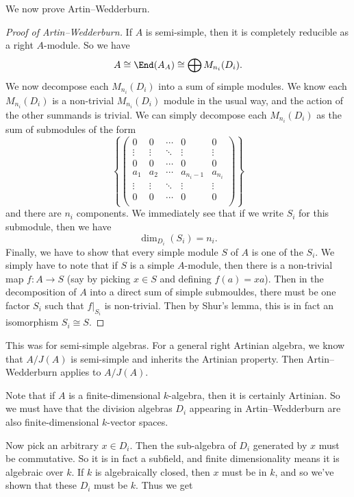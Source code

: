 \documentclass[a4paper]{article}
\begin{document}
We now prove Artin--Wedderburn.
\begin{proof}[Proof of Artin--Wedderburn]
  If $A$ is semi-simple, then it is completely reducible as a right $A$-module. So we have
  \[
    A \cong \End(A_A) \cong \bigoplus M_{n_i}(D_i).
  \]
  We now decompose each $M_{n_i}(D_i)$ into a sum of simple modules. We know each $M_{n_i}(D_i)$ is a non-trivial $M_{n_i}(D_i)$ module in the usual way, and the action of the other summands is trivial. We can simply decompose each $M_{n_i}(D_i)$ as the sum of submodules of the form
  \[
    \left\{
      \begin{pmatrix}
        0 & 0 & \cdots & 0 & 0\\
        \vdots & \vdots & \ddots & \vdots & \vdots\\
        0 & 0 & \cdots & 0 & 0\\
        a_1 & a_2 & \cdots & a_{n_i - 1} & a_{n_i}\\
        \vdots & \vdots & \ddots & \vdots & \vdots\\
        0 & 0 & \cdots & 0 & 0 \\
      \end{pmatrix}
    \right\}
  \]
  and there are $n_i$ components. We immediately see that if we write $S_i$ for this submodule, then we have
  \[
    \dim_{D_i}(S_i) = n_i.
  \]
  Finally, we have to show that every simple module $S$ of $A$ is one of the $S_i$. We simply have to note that if $S$ is a simple $A$-module, then there is a non-trivial map $f: A \to S$ (say by picking $x \in S$ and defining $f(a) = xa$). Then in the decomposition of $A$ into a direct sum of simple submouldes, there must be one factor $S_i$ such that $f|_{S_i}$ is non-trivial. Then by Shur's lemma, this is in fact an isomorphism $S_i \cong S$.
\end{proof}

This was for semi-simple algebras. For a general right Artinian algebra, we know that $A/J(A)$ is semi-simple and inherits the Artinian property. Then Artin--Wedderburn applies to $A/J(A)$.

Note that if $A$ is a finite-dimensional $k$-algebra, then it is certainly Artinian. So we must have that the division algebras $D_i$ appearing in Artin--Wedderburn are also finite-dimensional $k$-vector spaces.

Now pick an arbitrary $x \in D_i$. Then the sub-algebra of $D_i$ generated by $x$ must be commutative. So it is in fact a subfield, and finite dimensionality means it is algebraic over $k$. If $k$ is algebraically closed, then $x$ must be in $k$, and so we've shown that these $D_i$ must be $k$. Thus we get
\end{document}
